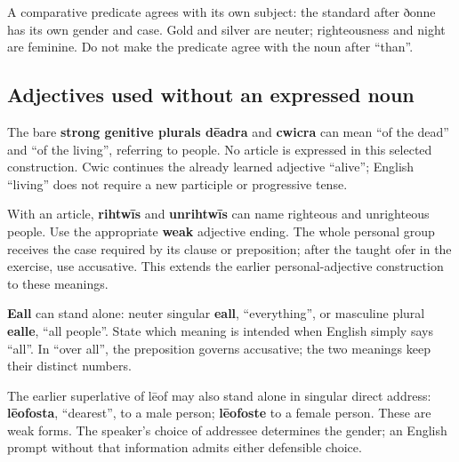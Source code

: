 A comparative predicate agrees with its own subject: the standard after ðonne has its own gender and case. Gold and silver are neuter; righteousness and night are feminine. Do not make the predicate agree with the noun after “than”.

\subsection*{Adjectives used without an expressed noun}

The bare \textbf{strong genitive plurals dēadra} and \textbf{cwicra} can mean “of the dead” and “of the living”, referring to people. No article is expressed in this selected construction. Cwic continues the already learned adjective “alive”; English “living” does not require a new participle or progressive tense.

With an article, \textbf{rihtwīs} and \textbf{unrihtwīs} can name righteous and unrighteous people. Use the appropriate \textbf{weak} adjective ending. The whole personal group receives the case required by its clause or preposition; after the taught ofer in the exercise, use accusative. This extends the earlier personal-adjective construction to these meanings.

\textbf{Eall} can stand alone: neuter singular \textbf{eall}, “everything”, or masculine plural \textbf{ealle}, “all people”. State which meaning is intended when English simply says “all”. In “over all”, the preposition governs accusative; the two meanings keep their distinct numbers.

The earlier superlative of lēof may also stand alone in singular direct address: \textbf{lēofosta}, “dearest”, to a male person; \textbf{lēofoste} to a female person. These are weak forms. The speaker’s choice of addressee determines the gender; an English prompt without that information admits either defensible choice.

